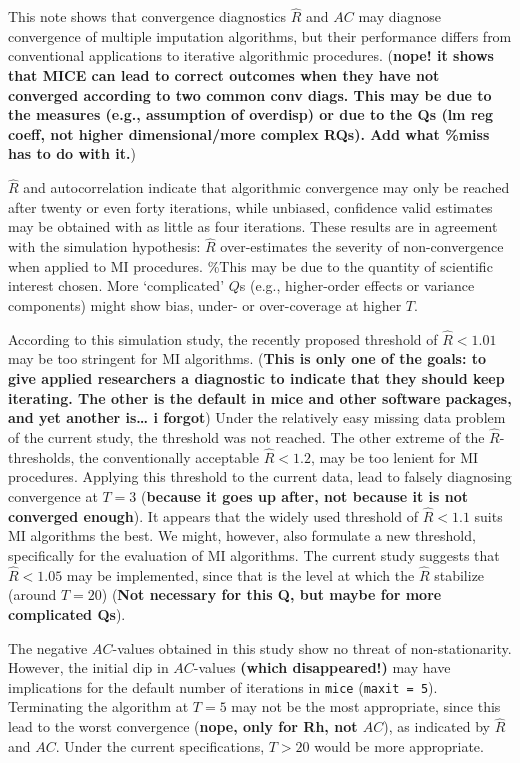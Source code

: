 \documentclass[Royal,times,sageh]{sagej}
\begin{document}
This note shows that convergence diagnostics \(\widehat{R}\) and \(AC\)
may diagnose convergence of multiple imputation algorithms, but their
performance differs from conventional applications to iterative
algorithmic procedures. (\textbf{nope! it shows that MICE can lead to
correct outcomes when they have not converged according to two common
conv diags. This may be due to the measures (e.g., assumption of
overdisp) or due to the Qs (lm reg coeff, not higher dimensional/more
complex RQs). Add what \%miss has to do with it.})

\(\widehat{R}\) and autocorrelation indicate that algorithmic
convergence may only be reached after twenty or even forty iterations,
while unbiased, confidence valid estimates may be obtained with as
little as four iterations. These results are in agreement with the
simulation hypothesis: \(\widehat{R}\) over-estimates the severity of
non-convergence when applied to MI procedures. \%This may be due to the
quantity of scientific interest chosen. More `complicated' \(Q\)s (e.g.,
higher-order effects or variance components) might show bias, under- or
over-coverage at higher \(T\).

According to this simulation study, the recently proposed threshold of
\(\widehat{R}<1.01\) may be too stringent for MI algorithms.
(\textbf{This is only one of the goals: to give applied researchers a
diagnostic to indicate that they should keep iterating. The other is the
default in mice and other software packages, and yet another is\ldots{}
i forgot}) Under the relatively easy missing data problem of the current
study, the threshold was not reached. The other extreme of the
\(\widehat{R}\)-thresholds, the conventionally acceptable
\(\widehat{R} <1.2\), may be too lenient for MI procedures. Applying
this threshold to the current data, lead to falsely diagnosing
convergence at \(T = 3\) (\textbf{because it goes up after, not because
it is not converged enough}). It appears that the widely used threshold
of \(\widehat{R} < 1.1\) suits MI algorithms the best. We might,
however, also formulate a new threshold, specifically for the evaluation
of MI algorithms. The current study suggests that \(\widehat{R} < 1.05\)
may be implemented, since that is the level at which the \(\widehat{R}\)
stabilize (around \(T = 20\)) (\textbf{Not necessary for this Q, but
maybe for more complicated Qs}).

The negative \(AC\)-values obtained in this study show no threat of
non-stationarity. However, the initial dip in \(AC\)-values
\textbf{(which disappeared!)} may have implications for the default
number of iterations in \texttt{mice} (\texttt{maxit\ =\ 5}).
Terminating the algorithm at \(T=5\) may not be the most appropriate,
since this lead to the worst convergence (\textbf{nope, only for Rh, not
\(AC\)}), as indicated by \(\widehat{R}\) and \(AC\). Under the current
specifications, \(T>20\) would be more appropriate.
\end{document}
